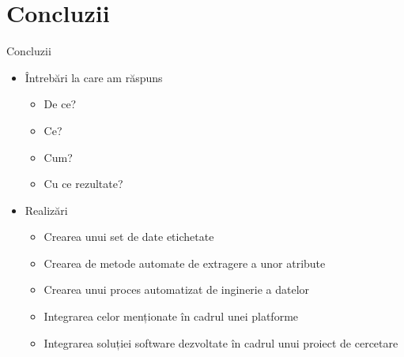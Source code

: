\section{Concluzii}

\begin{frame}{Concluzii} \pause
	\begin{itemize}
		\item Întrebări la care am răspuns \pause
		\begin{itemize}
		    \item De ce? \pause
		    \item Ce? \pause
		    \item Cum? \pause
		    \item Cu ce rezultate? \pause
		\end{itemize}
		\item Realizări \pause
		\begin{itemize}
		    \item Crearea unui set de date etichetate \pause
		    \item Crearea de metode automate de extragere a unor atribute \pause
		    \item Crearea unui proces automatizat de inginerie a datelor \pause
		    \item Integrarea celor menționate în cadrul unei platforme \pause
		    \item Integrarea soluției software dezvoltate în cadrul unui proiect de cercetare
		\end{itemize}
	\end{itemize}
\end{frame}